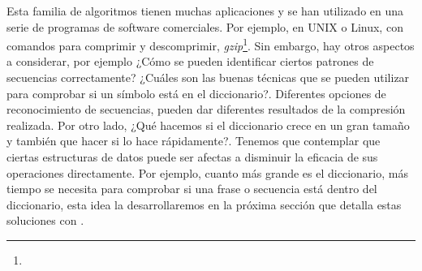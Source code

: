 Esta familia de algoritmos tienen muchas aplicaciones y se han utilizado en una serie de programas de software comerciales. Por ejemplo, en UNIX o Linux, con comandos para comprimir y descomprimir, \emph{gzip}\footnote{\footnoteGZIP}. Sin embargo, hay otros aspectos a considerar, por ejemplo ¿Cómo se pueden identificar ciertos patrones de secuencias correctamente? ¿Cuáles son las buenas técnicas que se pueden utilizar para comprobar si un símbolo está en el diccionario?. Diferentes opciones de reconocimiento de secuencias, pueden dar diferentes resultados de la compresión realizada. Por otro lado, ¿Qué hacemos si el diccionario crece en un gran tamaño y también que hacer si lo hace rápidamente?. Tenemos que contemplar que ciertas estructuras de datos puede ser afectas a disminuir la eficacia de sus operaciones directamente. Por ejemplo, cuanto más grande es el diccionario, más tiempo se necesita para comprobar si una frase o secuencia está dentro del diccionario, esta idea la desarrollaremos en la próxima sección que detalla estas soluciones con \lzSieteOcho. 





 
% 

 




